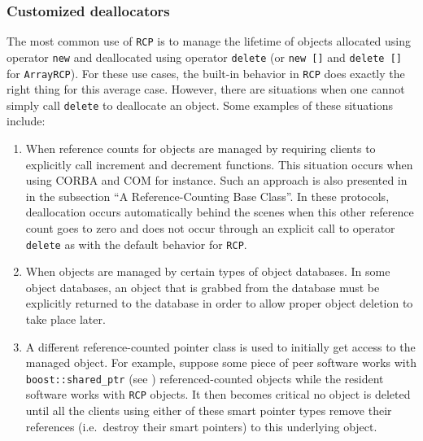 \documentclass[pdf,ps2pdf,11pt]{SANDreport}
\begin{document}
%
{}\subsubsection{Customized deallocators}
\label{sec:deallocators}
%

The most common use of {}\texttt{RCP} is to manage the lifetime of
objects allocated using operator {}\texttt{new} and deallocated using
operator {}\texttt{delete} (or {}\texttt{new []} and {}\texttt{delete
[]} for {}\texttt{ArrayRCP}).  For these use cases, the built-in
behavior in {}\texttt{RCP} does exactly the right thing for this
average case.  However, there are situations when one cannot simply
call {}\texttt{delete} to deallocate an object.  Some examples of
these situations include:

\begin{enumerate}

{}\item When reference counts for objects are managed by requiring
clients to explicitly call increment and decrement functions.  This
situation occurs when using CORBA {}\cite{ref:corba} and COM
{}\cite{ref:com} for instance.  Such an approach is also presented in
{}\cite[Item 29]{MoreEffectiveC++96} in the subsection ``A
Reference-Counting Base Class''.  In these protocols, deallocation
occurs automatically behind the scenes when this other reference count
goes to zero and does not occur through an explicit call to operator
{}\texttt{delete} as with the default behavior for {}\texttt{RCP}.

{}\item When objects are managed by certain types of object databases.
In some object databases, an object that is grabbed from the database
must be explicitly returned to the database in order to allow proper
object deletion to take place later.

{}\item A different reference-counted pointer class is used to
initially get access to the managed object.  For example, suppose some
piece of peer software works with {}\texttt{boost::shared\_ptr} (see
{}\cite{ref:boost}) referenced-counted objects while the resident
software works with {}\texttt{RCP} objects.  It then becomes critical
no object is deleted until all the clients using either of these smart
pointer types remove their references (i.e.\ destroy their smart
pointers) to this underlying object.

\end{enumerate}
\end{document}
